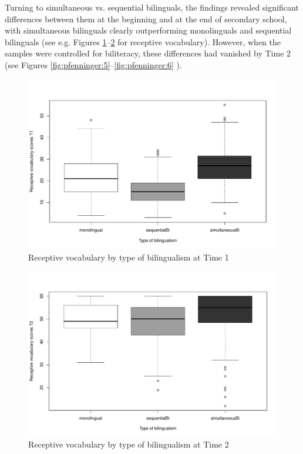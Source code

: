 \documentclass[output=paper,modfonts,nonflat,newtxmath]{langsci/langscibook}
\begin{document}
Turning to simultaneous vs. sequential bilinguals, the findings revealed significant differences between them at the beginning and at the end of secondary school, with simultaneous bilinguals clearly outperforming monolinguals and sequential bilinguals (see e.g. Figures \ref{fig:pfenninger:3}--\ref{fig:pfenninger:4} for receptive vocabulary). However, when the samples were controlled for biliteracy, these differences had vanished by Time 2 (see Figures \ref{fig:pfenninger:5}--\ref{fig:pfenninger:6} ).%

\begin{figure} %
\includegraphics[height=.45\textheight]{figures/PfenningerFigure3.pdf}
\caption{\label{fig:pfenninger:3} Receptive vocabulary by type of bilingualism at Time 1}
\end{figure}

\begin{figure} %
\includegraphics[height=.45\textheight]{figures/PfenningerFigure4.pdf}
\caption{\label{fig:pfenninger:4} Receptive vocabulary by type of bilingualism at Time 2}
 \end{figure}
\end{document}
